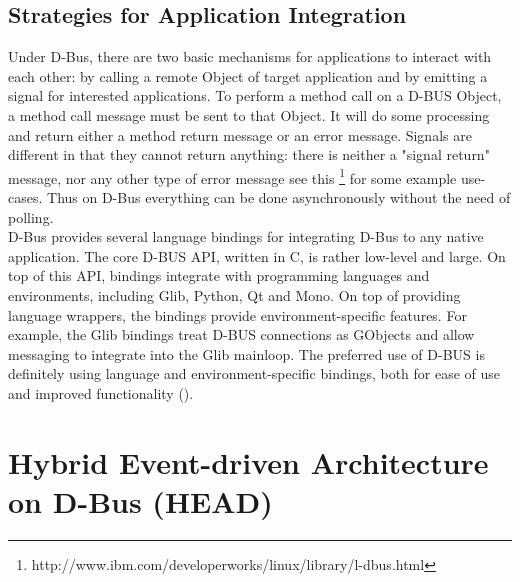 \documentclass{ifacconf}
\begin{document}
\subsection{Strategies for Application Integration}
Under D-Bus, there are two basic mechanisms for applications to interact with each other: by calling a remote Object of target application and by emitting a signal for interested applications. To perform a method call on a D-BUS Object, a method call message must be sent to that Object. It will do some processing and return either a method return message or an error message. Signals are different in that they cannot return anything: there is neither a "signal return" message, nor any other type of error message see this \footnote{http://www.ibm.com/developerworks/linux/library/l-dbus.html} for some example use-cases. Thus on D-Bus everything can be done asynchronously without the need of polling.\\ 
D-Bus provides several language bindings for integrating D-Bus to any native application. The core D-BUS API, written in C, is rather low-level and large. On top of this API, bindings integrate with programming languages and environments, including Glib, Python, Qt and Mono. On top of providing language wrappers, the bindings provide environment-specific features. For example, the Glib bindings treat D-BUS connections as GObjects and allow messaging to integrate into the Glib mainloop. The preferred use of D-BUS is definitely using language and environment-specific bindings, both for ease of use and improved functionality (\cite{Love2005}).
\section{Hybrid Event-driven Architecture on D-Bus (HEAD)}
\label{sec:head}
\end{document}
